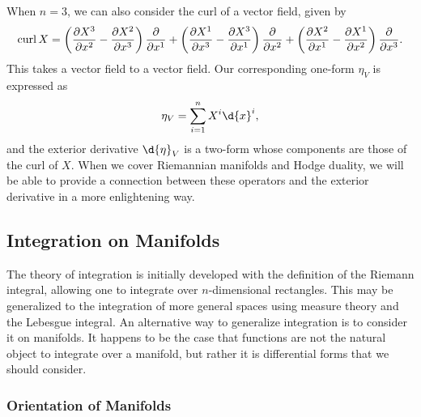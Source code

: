 \documentclass[a4paper,12pt]{article}
\begin{document}
When $n = 3$, we can also consider the curl of a vector field, given by
\begin{equation}
    \operatorname{curl} X = \left(\frac{\partial X^3}{\partial x^2} - \frac{\partial X^2}{\partial x^3}\right) \frac{\partial}{\partial x^1} + \left(\frac{\partial X^1}{\partial x^3} - \frac{\partial X^3}{\partial x^1}\right) \frac{\partial}{\partial x^2} + \left(\frac{\partial X^2}{\partial x^1} - \frac{\partial X^1}{\partial x^2}\right) \frac{\partial}{\partial x^3}.
\end{equation}
This takes a vector field to a vector field.
Our corresponding one-form $\eta_V$ is expressed as
\begin{equation}
    \eta_V = \sum_{i=1}^n X^i \d{x}^i,
\end{equation}
and the exterior derivative $\d{\eta}_V$ is a two-form whose components are those of the curl of $X$.
When we cover Riemannian manifolds and Hodge duality, we will be able to provide a connection between these operators and the exterior derivative in a more enlightening way.

\subsection{Integration on Manifolds}\label{subsec:differential_forms:integration_on_manifolds}

The theory of integration is initially developed with the definition of the Riemann integral, allowing one to integrate over $n$-dimensional rectangles.
This may be generalized to the integration of more general spaces using measure theory and the Lebesgue integral.
An alternative way to generalize integration is to consider it on manifolds.
It happens to be the case that functions are not the natural object to integrate over a manifold, but rather it is differential forms that we should consider.

\subsubsection{Orientation of Manifolds}\label{subsubsec:differential_forms:integration_on_manifolds:orientation_of_manifolds}
\end{document}

